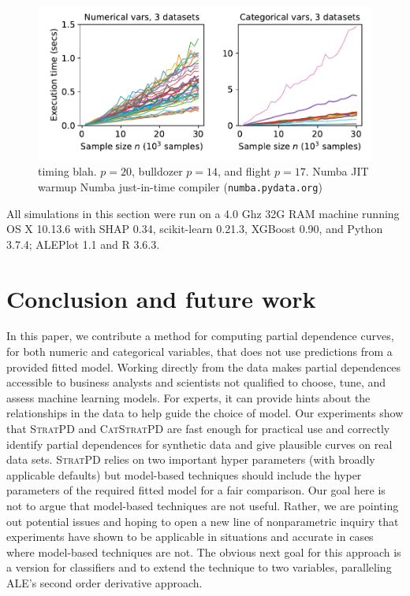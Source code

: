 \documentclass{article}
\newcommand{\cut}[1]{}
\newcommand{\spd}{\fontfamily{cmr}\textsc{\small StratPD}}
\newcommand{\cspd}{\fontfamily{cmr}\textsc{\small CatStratPD}}
\begin{document}
\begin{figure}[htbp]
\begin{center}
\includegraphics[scale=.4]{images/timing.pdf}
\caption{\small timing blah. $p=20$, bulldozer $p=14$, and flight $p=17$. Numba JIT warmup Numba just-in-time compiler ({\tt\small numba.pydata.org})}
\label{fig:timing}
\end{center}
\end{figure}

\cut{
flight shape (5714008, 17), 6 cats
rent shape (49352, 20), no cats
bulldozer shape (362781, 14) records, 5 cats
}

All simulations in this section were run on a 4.0 Ghz 32G RAM machine running OS X 10.13.6 with SHAP 0.34, scikit-learn 0.21.3, XGBoost 0.90, and Python 3.7.4; ALEPlot 1.1 and R 3.6.3.

\section{Conclusion and future work}

In this paper, we contribute a method for computing partial dependence curves, for both numeric and categorical variables, that does not use  predictions from a provided fitted model.   Working directly from the data  makes partial dependences accessible to business analysts and scientists not qualified to choose, tune, and assess machine learning models.  For experts, it can  provide hints about the relationships in the data to help guide the choice of model. Our experiments show that \spd{} and \cspd{} are fast enough for practical use and correctly identify partial dependences for synthetic data and give plausible curves on real data sets. \spd{} relies on two important hyper parameters (with broadly applicable defaults) but model-based techniques should include the hyper parameters of the required fitted model for a fair comparison.  Our goal here is not to  argue  that model-based techniques are not useful. Rather, we are pointing out potential issues and hoping to open a new line of nonparametric inquiry that experiments have shown to be applicable in situations and accurate in cases where model-based techniques are not. The obvious next goal for this approach is a version for classifiers and to extend the technique to two variables, paralleling ALE's second order derivative approach.
\end{document}
